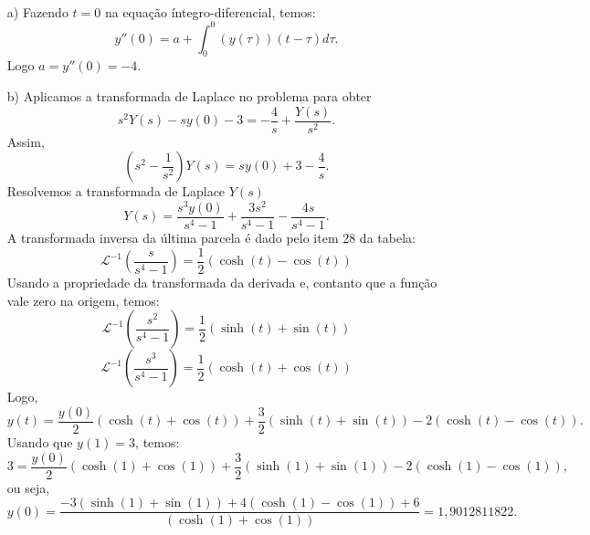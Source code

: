 \begin{resol}
 ~
  \begin{itemize}
    \item[a)] Fazendo $t=0$ na equação íntegro-diferencial, temos:
    $$ y''(0) = a+ \int_0^0(y(\tau))(t-\tau)d\tau. $$
    Logo $a=y''(0)=-4$.
    \item[b)] Aplicamos a transformada de Laplace no problema para obter
    $$
    s^2Y(s)-sy(0)-3 = -\frac{4}{s}+\frac{Y(s)}{s^2}.
    $$
    Assim,
    $$
    \left(s^2-\frac{1}{s^2}\right)Y(s) = sy(0)+3-\frac{4}{s}.
    $$
    Resolvemos a transformada de Laplace $Y(s)$
    $$
    Y(s) = \frac{s^3y(0)}{s^4-1}+\frac{3s^2}{s^4-1}-\frac{4s}{s^4-1}.
    $$
    A transformada inversa da última parcela é dado pelo item 28 da tabela:
    $$
    \mathcal{L}^{-1}\left(\frac{s}{s^4-1}\right)=\frac{1}{2}\left(\cosh(t)-\cos(t)\right)
    $$
    Usando a propriedade da transformada da derivada e, contanto que a função vale zero na origem, temos:
    $$
    \mathcal{L}^{-1}\left(\frac{s^2}{s^4-1}\right)=\frac{1}{2}\left(\sinh(t)+\sin(t)\right)
    $$
    $$
    \mathcal{L}^{-1}\left(\frac{s^3}{s^4-1}\right)=\frac{1}{2}\left(\cosh(t)+\cos(t)\right)
    $$
    Logo,
    $$
    y(t) =\frac{y(0)}{ 2}\left(\cosh(t)+\cos(t)\right)+\frac{3}{2}\left(\sinh(t)+\sin(t)\right)-2\left(\cosh(t)-\cos(t)\right).
    $$
    Usando que $y(1)=3$, temos:
    $$
    3 =\frac{y(0)}{ 2}\left(\cosh(1)+\cos(1)\right)+\frac{3}{2}\left(\sinh(1)+\sin(1)\right)-2\left(\cosh(1)-\cos(1)\right),
    $$
    ou seja,
    $$
    y(0)=\frac{-3\left(\sinh(1)+\sin(1)\right)+4\left(\cosh(1)-\cos(1)\right)+6}{\left(\cosh(1)+\cos(1)\right)}=1,9012811822.
    $$
    
  \end{itemize}
\end{resol}


